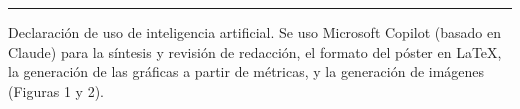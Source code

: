 \documentclass[10pt]{article}
\newcommand{\serif}{\fontfamily{bch}\selectfont}
\begin{document}
\vfill
{\color{olive}\rule{\linewidth}{2.5pt}}
\vspace{0.3cm}
\noindent
{\fontsize{18}{23}\selectfont\color{ink}
{\serif\color{olivedark}\fontsize{22}{28}\selectfont Declaración de uso de inteligencia artificial.}
Se uso Microsoft Copilot (basado en Claude) para la síntesis y revisión de redacción, el formato del póster en \LaTeX{}, la generación de las gráficas a partir de métricas, y la generación de imágenes (Figuras 1 y 2).\par}
\end{document}
